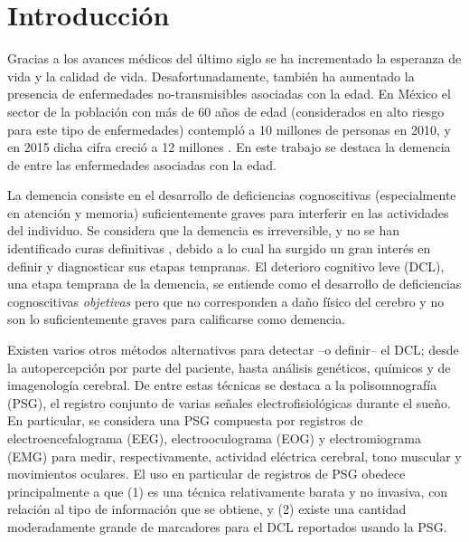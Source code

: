 
\chapter*{Introducción}

Gracias a los avances médicos del último siglo se ha incrementado la esperanza de vida y la calidad de vida. 
%
Desafortunadamente, también ha aumentado la presencia de enfermedades no-transmisibles asociadas con la edad. 
%
En México el sector de la población con más de 60 años de edad (considerados en alto riesgo para este tipo de enfermedades) contempló a 10 millones de personas en 2010, y en 2015 dicha cifra creció a 12 millones \cite{Censo10,Intercensal15}.
%
En este trabajo se destaca la demencia de entre las enfermedades asociadas con la edad.

La demencia consiste en el desarrollo de deficiencias cognoscitivas (especialmente en atención y memoria) suficientemente graves para interferir en las actividades del individuo.
%
Se considera que la demencia es irreversible, y no se han identificado curas definitivas \cite{PlanAlzheimer04}, debido a lo cual ha surgido un gran interés en definir y diagnosticar sus etapas tempranas.
%
El deterioro cognitivo leve (DCL), una etapa temprana de la demencia, se entiende como el desarrollo de deficiencias cognoscitivas \textit{objetivas} pero que no corresponden a daño físico del cerebro y no son lo suficientemente graves para calificarse como demencia.

Existen varios otros métodos alternativos para detectar --o definir-- el DCL; desde la autopercepción por parte del paciente, hasta análisis genéticos, químicos y de imagenología cerebral.
%
De entre estas técnicas se destaca a la polisomnografía (PSG), el registro conjunto de varias señales electrofisiológicas durante el sueño.
%
En particular, se considera una PSG compuesta por registros de electroencefalograma (EEG), electrooculograma (EOG) y electromiograma (EMG) para medir, respectivamente, actividad eléctrica cerebral, tono muscular y movimientos oculares.
%
El uso en particular de registros de PSG obedece principalmente a que (1) es una técnica relativamente barata y no invasiva, con relación al tipo de información que se obtiene, y (2) existe una cantidad moderadamente grande de marcadores para el DCL reportados usando la PSG.


